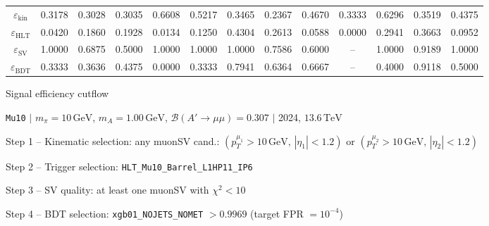 \documentclass[10pt,a4paper]{article}
\begin{document}
\begin{landscape}
{\begin{tabular}{c|cccc|cccc|cccc}
\midrule
$\varepsilon_{\mathrm{kin}}$ & 0.3178 & 0.3028 & 0.3035 & 0.6608 & 0.5217 & 0.3465 & 0.2367 & 0.4670 & 0.3333 & 0.6296 & 0.3519 & 0.4375\\
$\varepsilon_{\mathrm{HLT}}$ & 0.0420 & 0.1860 & 0.1928 & 0.0134 & 0.1250 & 0.4304 & 0.2613 & 0.0588 & 0.0000 & 0.2941 & 0.3663 & 0.0952\\
$\varepsilon_{\mathrm{SV}}$ & 1.0000 & 0.6875 & 0.5000 & 1.0000 & 1.0000 & 1.0000 & 0.7586 & 0.6000 & -- & 1.0000 & 0.9189 & 1.0000\\
$\varepsilon_{\mathrm{BDT}}$ & 0.3333 & 0.3636 & 0.4375 & 0.0000 & 0.3333 & 0.7941 & 0.6364 & 0.6667 & -- & 0.4000 & 0.9118 & 0.5000\\
\bottomrule
\end{tabular}}

\end{landscape}
\clearpage

{\large Signal efficiency cutflow

 \texttt{Mu10} $|$ $m_{\pi}=10\,\mathrm{GeV}$, $m_{A}=1.00\,\mathrm{GeV}$, $\mathcal{B}(A'\!\to\!\mu\mu)=0.307$ $|$ 2024, $13.6\,\mathrm{TeV}$}

\vspace{0.8em}

Step 1 -- Kinematic selection: any muonSV cand.: $(p_T^{\mu_1}{>}10\,\mathrm{GeV},\,|\eta_1|{<}1.2)$ or $(p_T^{\mu_2}{>}10\,\mathrm{GeV},\,|\eta_2|{<}1.2)$

Step 2 -- Trigger selection: \texttt{HLT\_Mu10\_Barrel\_L1HP11\_IP6}

Step 3 -- SV quality: at least one muonSV with $\chi^2<10$

Step 4 -- BDT selection: \texttt{xgb01\_NOJETS\_NOMET} $>0.9969$ (target FPR $=10^{-4}$)

\vspace{0.8em}
\end{document}
